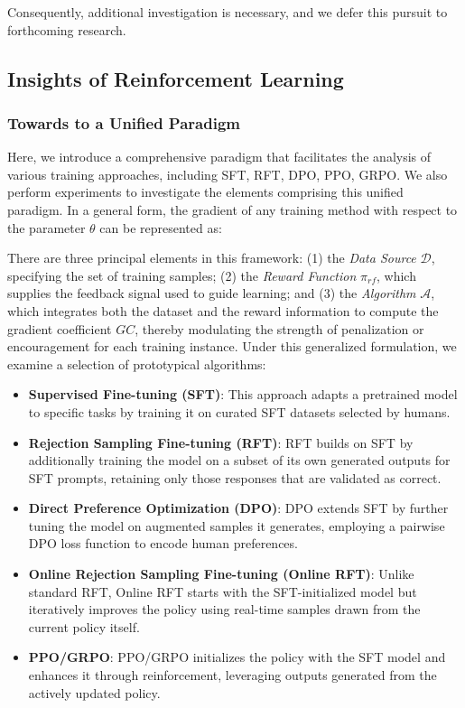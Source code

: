 \begin{itemize}[topsep=0pt]
Consequently, additional investigation is necessary, and we defer this pursuit to forthcoming research.

\subsection{Insights of Reinforcement Learning}
\subsubsection{Towards to a Unified Paradigm} Here, we introduce a comprehensive paradigm that facilitates the analysis of various training approaches, including SFT, RFT, DPO, PPO, GRPO. We also perform experiments to investigate the elements comprising this unified paradigm. In a general form, the gradient of any training method with respect to the parameter $\theta$ can be represented as:

There are three principal elements in this framework: (1) the \textit{Data Source} $\mathcal{D}$, specifying the set of training samples; (2) the \textit{Reward Function} $\pi_{{rf}}$, which supplies the feedback signal used to guide learning; and (3) the \textit{Algorithm} $\mathcal{A}$, which integrates both the dataset and the reward information to compute the gradient coefficient $GC$, thereby modulating the strength of penalization or encouragement for each training instance. Under this generalized formulation, we examine a selection of prototypical algorithms:

\begin{itemize}
    \item \textbf{Supervised Fine-tuning (SFT)}: This approach adapts a pretrained model to specific tasks by training it on curated SFT datasets selected by humans.
    \item \textbf{Rejection Sampling Fine-tuning (RFT)}: RFT builds on SFT by additionally training the model on a subset of its own generated outputs for SFT prompts, retaining only those responses that are validated as correct.
    \item \textbf{Direct Preference Optimization (DPO)}: DPO extends SFT by further tuning the model on augmented samples it generates, employing a pairwise DPO loss function to encode human preferences.
    \item \textbf{Online Rejection Sampling Fine-tuning (Online RFT)}: Unlike standard RFT, Online RFT starts with the SFT-initialized model but iteratively improves the policy using real-time samples drawn from the current policy itself.
    \item \textbf{PPO/GRPO}: PPO/GRPO initializes the policy with the SFT model and enhances it through reinforcement, leveraging outputs generated from the actively updated policy.
\end{itemize}


\end{itemize}
